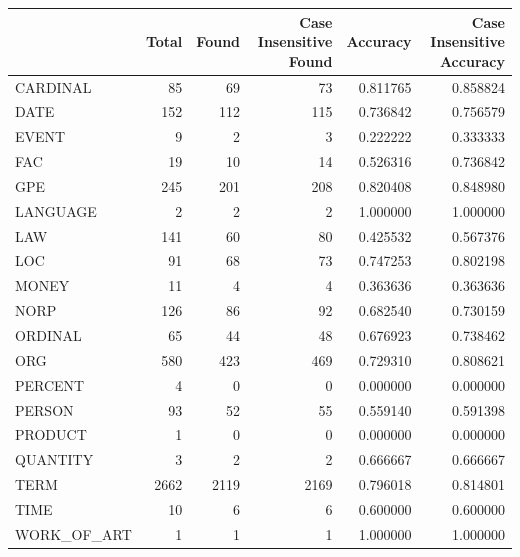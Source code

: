 \begin{tabular}{lrrrrr}
\toprule
 & Total & Found & Case Insensitive Found & Accuracy & Case Insensitive Accuracy \\
\midrule
CARDINAL & 85 & 69 & 73 & 0.811765 & 0.858824 \\
DATE & 152 & 112 & 115 & 0.736842 & 0.756579 \\
EVENT & 9 & 2 & 3 & 0.222222 & 0.333333 \\
FAC & 19 & 10 & 14 & 0.526316 & 0.736842 \\
GPE & 245 & 201 & 208 & 0.820408 & 0.848980 \\
LANGUAGE & 2 & 2 & 2 & 1.000000 & 1.000000 \\
LAW & 141 & 60 & 80 & 0.425532 & 0.567376 \\
LOC & 91 & 68 & 73 & 0.747253 & 0.802198 \\
MONEY & 11 & 4 & 4 & 0.363636 & 0.363636 \\
NORP & 126 & 86 & 92 & 0.682540 & 0.730159 \\
ORDINAL & 65 & 44 & 48 & 0.676923 & 0.738462 \\
ORG & 580 & 423 & 469 & 0.729310 & 0.808621 \\
PERCENT & 4 & 0 & 0 & 0.000000 & 0.000000 \\
PERSON & 93 & 52 & 55 & 0.559140 & 0.591398 \\
PRODUCT & 1 & 0 & 0 & 0.000000 & 0.000000 \\
QUANTITY & 3 & 2 & 2 & 0.666667 & 0.666667 \\
TERM & 2662 & 2119 & 2169 & 0.796018 & 0.814801 \\
TIME & 10 & 6 & 6 & 0.600000 & 0.600000 \\
WORK_OF_ART & 1 & 1 & 1 & 1.000000 & 1.000000 \\
\bottomrule
\end{tabular}
